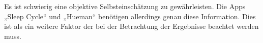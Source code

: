Es ist schwierig eine objektive Selbsteinschätzung zu gewährleisten. Die Apps „Sleep Cycle“ und „Hueman“ benötigen allerdings genau diese Information.
Dies ist als ein weitere Faktor der bei der Betrachtung der Ergebnisse beachtet werden muss.








